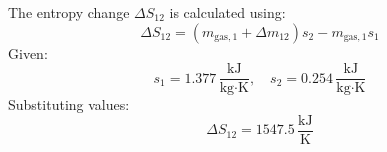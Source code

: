 The entropy change \( \Delta S_{12} \) is calculated using:  
\[
\Delta S_{12} = (m_{\text{gas},1} + \Delta m_{12}) s_2 - m_{\text{gas},1} s_1
\]  
Given:  
\[
s_1 = 1.377 \, \frac{\text{kJ}}{\text{kg·K}}, \quad s_2 = 0.254 \, \frac{\text{kJ}}{\text{kg·K}}
\]  
Substituting values:  
\[
\Delta S_{12} = 1547.5 \, \frac{\text{kJ}}{\text{K}}
\]